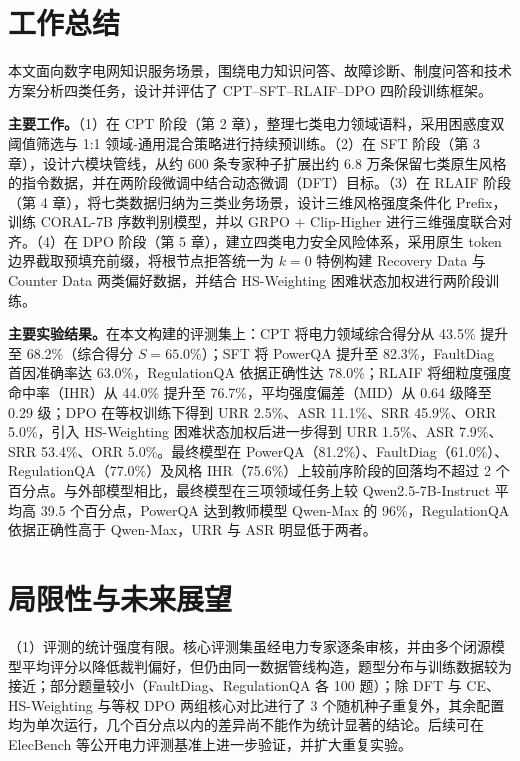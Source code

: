\documentclass[fontset=fandol,type=master,campus=shenzhen,etitleauto=true]{hithesisbook}
\begin{document}
\backmatter
\begin{conclusions}
\label{ux603bux7ed3ux4e0eux5c55ux671b}

\section*{工作总结}\label{ux5de5ux4f5cux603bux7ed3}

本文面向数字电网知识服务场景，围绕电力知识问答、故障诊断、制度问答和技术方案分析四类任务，设计并评估了 CPT--SFT--RLAIF--DPO 四阶段训练框架。

\textbf{主要工作。}（1）在 CPT 阶段（第 2 章），整理七类电力领域语料，采用困惑度双阈值筛选与 1:1 领域-通用混合策略进行持续预训练。（2）在 SFT 阶段（第 3 章），设计六模块管线，从约 600 条专家种子扩展出约 6.8 万条保留七类原生风格的指令数据，并在两阶段微调中结合动态微调（DFT）目标。（3）在 RLAIF 阶段（第 4 章），将七类数据归纳为三类业务场景，设计三维风格强度条件化 Prefix，训练 CORAL-7B 序数判别模型，并以 GRPO + Clip-Higher 进行三维强度联合对齐。（4）在 DPO 阶段（第 5 章），建立四类电力安全风险体系，采用原生 token 边界截取预填充前缀，将根节点拒答统一为 $k=0$ 特例构建 Recovery Data 与 Counter Data 两类偏好数据，并结合 HS-Weighting 困难状态加权进行两阶段训练。

\textbf{主要实验结果。}在本文构建的评测集上：CPT 将电力领域综合得分从 43.5\% 提升至 68.2\%（综合得分 $S=65.0\%$）；SFT 将 PowerQA 提升至 82.3\%，FaultDiag 首因准确率达 63.0\%，RegulationQA 依据正确性达 78.0\%；RLAIF 将细粒度强度命中率（IHR）从 44.0\% 提升至 76.7\%，平均强度偏差（MID）从 0.64 级降至 0.29 级；DPO 在等权训练下得到 URR 2.5\%、ASR 11.1\%、SRR 45.9\%、ORR 5.0\%，引入 HS-Weighting 困难状态加权后进一步得到 URR 1.5\%、ASR 7.9\%、SRR 53.4\%、ORR 5.0\%。最终模型在 PowerQA（81.2\%）、FaultDiag（61.0\%）、RegulationQA（77.0\%）及风格 IHR（75.6\%）上较前序阶段的回落均不超过 2 个百分点。与外部模型相比，最终模型在三项领域任务上较 Qwen2.5-7B-Instruct 平均高 39.5 个百分点，PowerQA 达到教师模型 Qwen-Max 的 96\%，RegulationQA 依据正确性高于 Qwen-Max，URR 与 ASR 明显低于两者。

\section*{局限性与未来展望}\label{ux5c40ux9650ux6027ux4e0eux672aux6765ux5c55ux671b}

\noindent （1）评测的统计强度有限。核心评测集虽经电力专家逐条审核，并由多个闭源模型平均评分以降低裁判偏好，但仍由同一数据管线构造，题型分布与训练数据较为接近；部分题量较小（FaultDiag、RegulationQA 各 100 题）；除 DFT 与 CE、HS-Weighting 与等权 DPO 两组核心对比进行了 3 个随机种子重复外，其余配置均为单次运行，几个百分点以内的差异尚不能作为统计显著的结论。后续可在 ElecBench\cite{ref21} 等公开电力评测基准上进一步验证，并扩大重复实验。


\end{conclusions}
\end{document}
